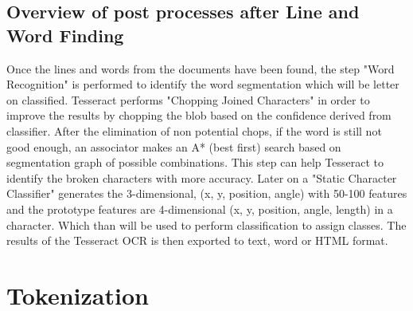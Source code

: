 \subsection{Overview of post processes after Line and Word Finding}

Once the lines and words from the documents have been found, the step "Word Recognition" \cite{AnOverviewoftheTesseractOCREngine} is performed to identify the word segmentation which will be letter on classified. Tesseract performs "Chopping Joined Characters" in order to improve the results by chopping the blob based on the confidence derived from classifier. After the elimination of non potential chops, if the word is still not good enough, an associator makes an A* (best first) search based on  segmentation graph of possible combinations. This step can help Tesseract to identify the broken characters with more accuracy. Later on a "Static Character Classifier" \cite{AnOverviewoftheTesseractOCREngine} generates the 3-dimensional, (x, y, position, angle) with 50-100 features and the prototype features are 4-dimensional (x, y, position, angle, length) in a character. Which than will be used to perform classification to assign classes. The results of the Tesseract OCR is then exported to text, word or HTML format.

\section{Tokenization}

